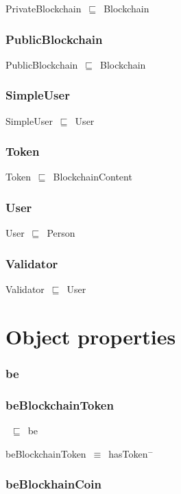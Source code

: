 \documentclass{article}
\begin{document}
PrivateBlockchain~\ensuremath{\sqsubseteq}~Blockchain~

\subsubsection*{PublicBlockchain}

PublicBlockchain~\ensuremath{\sqsubseteq}~Blockchain~

\subsubsection*{SimpleUser}

SimpleUser~\ensuremath{\sqsubseteq}~User~

\subsubsection*{Token}

Token~\ensuremath{\sqsubseteq}~BlockchainContent~

\subsubsection*{User}

User~\ensuremath{\sqsubseteq}~Person~

\subsubsection*{Validator}

Validator~\ensuremath{\sqsubseteq}~User~

\section*{Object properties}\subsubsection*{be}

\subsubsection*{beBlockchainToken}

~\ensuremath{\sqsubseteq}~be

beBlockchainToken~\ensuremath{\equiv}~hasToken\ensuremath{^-}

\subsubsection*{beBlockhainCoin}
\end{document}
